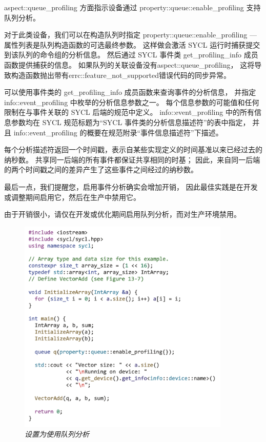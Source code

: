 aspect::queue\_profiling 方面指示设备通过 property::queue::enable\_profiling 支持队列分析。

对于此类设备，我们可以在构造队列时指定 property::queue::enable\_profiling — 
属性列表是队列构造函数的可选最终参数。 这样做会激活 SYCL 运行时捕获提交到该队列的命令组的分析信息。 
然后通过 SYCL 事件类 get\_profiling\_info 成员函数提供捕获的信息。 
如果队列的关联设备没有aspect::queue\_profiling，
这将导致构造函数抛出带有errc::feature\_not\_supported错误代码的同步异常。

可以使用事件类的 get\_profiling\_info 成员函数来查询事件的分析信息，
并指定 info::event\_profiling 中枚举的分析信息参数之一。 
每个信息参数的可能值和任何限制在与事件关联的 SYCL 后端的规范中定义。 
info::event\_profiling 中的所有信息参数均在 SYCL 规范标题为“SYCL 事件类的分析信息描述符”的表中指定，
并且 info::event\_profiling 的概要在规范附录“事件信息描述符”下描述。

每个分析描述符返回一个时间戳，表示自某些实现定义的时间基准以来已经过去的纳秒数。 
共享同一后端的所有事件都保证共享相同的时基； 
因此，来自同一后端的两个时间戳之间的差异产生了这些事件之间经过的纳秒数。

最后一点，我们提醒您，启用事件分析确实会增加开销，
因此最佳实践是在开发或调整期间启用它，然后在生产中禁用它。

\begin{remark}
	由于开销很小，请仅在开发或优化期间启用队列分析，而对生产环境禁用。
\end{remark}

\begin{figure}[H]
	\centering
	\includegraphics[width=0.9\textwidth]{figs/F13.6.png}
	\caption{\textit{设置为使用队列分析 }}
\end{figure}

